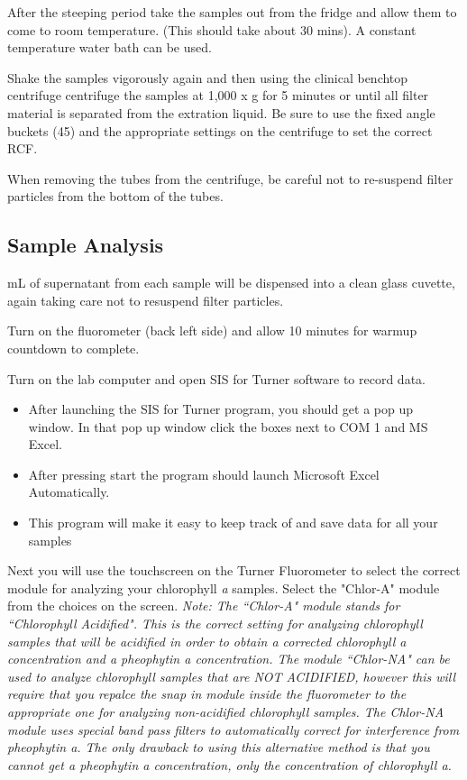 \documentclass[12pt]{../SOP3_alpha}
\begin{document}
\NP After the steeping period take the samples out from the fridge and allow them to come to room temperature. (This should take about 30 mins). A constant temperature water bath can be used.

\NP Shake the samples vigorously again and then using the clinical benchtop centrifuge centrifuge the samples at 1,000 x g for 5 minutes or until all filter material is separated from the extration liquid. Be sure to use the fixed angle buckets (45\degree) and the appropriate settings on the centrifuge to set the correct RCF. 

\NP When removing the tubes from the centrifuge, be careful not to re-suspend filter particles from the bottom of the tubes.


\subsection*{Sample Analysis}

 mL of supernatant from each sample will be dispensed into a clean glass cuvette, again taking care not to resuspend filter particles.

\NP Turn on the fluorometer (back left side) and allow 10 minutes for warmup countdown to complete. 

\NP Turn on the lab computer and open SIS for Turner software to record data. 
\begin{itemize}
\item After launching the SIS for Turner program, you should get a pop up window. In that pop up window click the boxes next to COM 1 and MS Excel.
\item After pressing start the program should launch Microsoft Excel Automatically.
\item This program will make it easy to keep track of and save data for all your samples
\end{itemize}

\NP Next you will use the touchscreen on the Turner Fluorometer to select the correct module for analyzing your chlorophyll \textit{a} samples. Select the "Chlor-A" module from the choices on the screen. {\small \textit{Note: The ``Chlor-A" module stands for ``Chlorophyll Acidified". This is the correct setting for analyzing chlorophyll samples that will be acidified in order to obtain a corrected chlorophyll a concentration and a pheophytin a concentration. The module ``Chlor-NA" can be used to analyze chlorophyll samples that are NOT ACIDIFIED, however this will require that you repalce the snap in module inside the fluorometer to the appropriate one for analyzing non-acidified chlorophyll samples. The Chlor-NA module uses special band pass filters to automatically correct for interference from pheophytin a. The only drawback to using this alternative method is that you cannot get a pheophytin a concentration, only the concentration of chlorophyll a.}}
\end{document}
